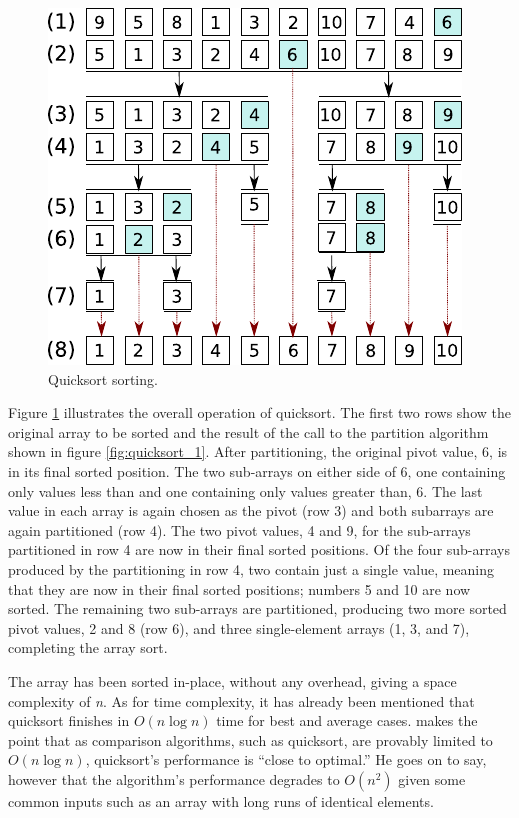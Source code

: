 \documentclass[12pt, a4paper]{article}
\begin{document}
\begin{figure}
    \centering
    \includegraphics{quicksort_2.pdf}
    \caption{\label{fig:quicksort_2}Quicksort sorting.}
\end{figure}

Figure \ref{fig:quicksort_2} illustrates the overall operation of quicksort. The first two rows show the original array to be sorted and the result of the call to the partition algorithm shown in figure \ref{fig:quicksort_1}. After partitioning, the original pivot value, 6, is in its final sorted position. The two sub-arrays on either side of 6, one containing only values less than and one containing only values greater than, 6. The last value in each array is again chosen as the pivot (row 3) and both subarrays are again partitioned (row 4). The two pivot values, 4 and 9, for the sub-arrays partitioned in row 4 are now in their final sorted positions. Of the four sub-arrays produced by the partitioning in row 4, two contain just a single value, meaning that they are now in their final sorted positions; numbers 5 and 10 are now sorted. The remaining two sub-arrays are partitioned, producing two more sorted pivot values, 2 and 8 (row 6), and three single-element arrays (1, 3, and 7), completing the array sort. 

The array has been sorted in-place, without any overhead, giving a space complexity of \emph{n}. As for time complexity, it has already been mentioned that quicksort finishes in $O(n\log n)$ time for best and average cases. \textcite[119]{bentley:pearls} makes the point that as comparison algorithms, such as quicksort, are provably limited to $O(n\log n)$, quicksort's performance is ``close to optimal.''  He goes on to say, however that the algorithm's performance degrades to $O(n^{2})$ given some common inputs such as an array with long runs of identical elements.
\end{document}
